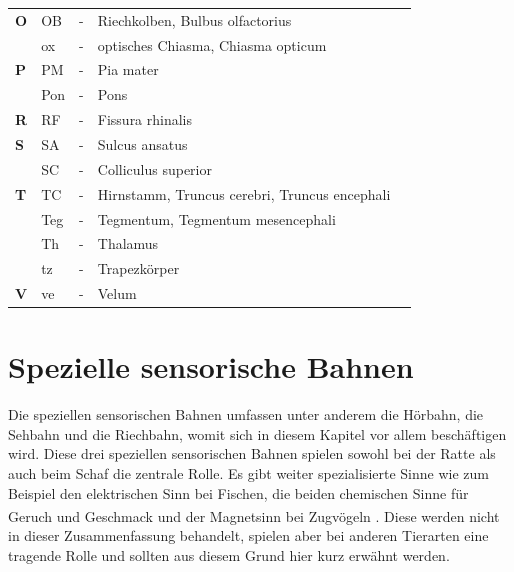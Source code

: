 \documentclass[12pt,a4paper,pdftex]{article}
\begin{document}
\begin{table}[H]
\begin{tabular}{llcll}
\textbf{O} & OB  & -          & Riechkolben, Bulbus olfactorius                                                      &                               \\
\textbf{}  & ox  & -          & optisches Chiasma, Chiasma opticum           &                               \\
\textbf{P} & PM  & -          & Pia mater                                                               &                               \\
\textbf{}  & Pon & -          & Pons                                                                    &                               \\
\textbf{R} & RF  & -          & Fissura rhinalis                                                        &                               \\
\textbf{S} & SA  & -          & Sulcus ansatus                                                          &                               \\
\textbf{}  & SC  & -          & Colliculus superior                                                     &                               \\
\textbf{T} & TC  & -          & Hirnstamm, Truncus cerebri, Truncus encephali &                               \\
\textbf{}  & Teg & -          & Tegmentum, Tegmentum mesencephali           &                               \\
\textbf{}  & Th  & -          & Thalamus                                                                &                               \\
\textbf{}  & tz  & -          & Trapezkörper                                                            &                               \\
\textbf{V} & ve  & -          & Velum                                                                   &                              
\end{tabular}
\end{table}

\newpage
\section{Spezielle sensorische Bahnen}
\label{sec:spezsens}
Die speziellen sensorischen Bahnen umfassen unter anderem die Hörbahn, die Sehbahn und die Riechbahn, womit sich in diesem Kapitel vor allem beschäftigen wird. Diese drei speziellen sensorischen Bahnen spielen sowohl bei der Ratte als auch beim Schaf die zentrale Rolle. Es gibt weiter spezialisierte Sinne wie zum Beispiel den elektrischen Sinn bei Fischen, die beiden chemischen Sinne für Geruch und Geschmack und der Magnetsinn bei Zugvögeln \textsuperscript{\cite{smith2008biology}}. Diese werden nicht in dieser Zusammenfassung behandelt, spielen aber bei anderen Tierarten eine tragende Rolle und sollten aus diesem Grund hier kurz erwähnt werden.
\end{document}
